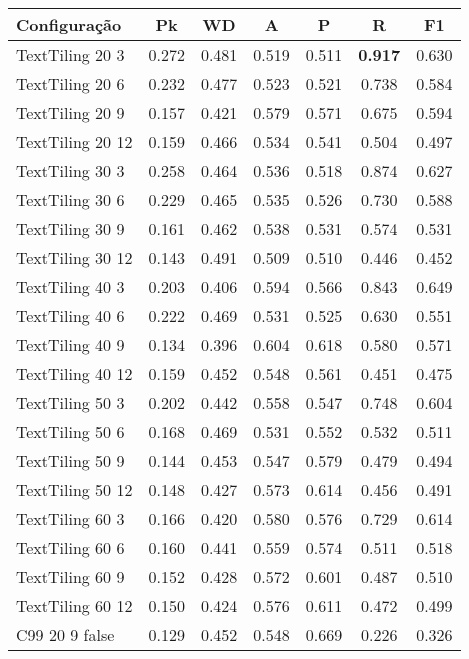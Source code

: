 \documentclass{article}
\begin{document}
 
\begin{tabular}{|l|c|c|c|c|c|c|} 
\hline 
Configuração & \textbf{Pk} & \textbf{WD} & \textbf{A } & \textbf{P } & \textbf{R } & \textbf{F1}\\ \hline
TextTiling 20  3 & 0.272 & 0.481 & 0.519 & 0.511 & \textbf{0.917} & 0.630\\ \hline
TextTiling 20  6 & 0.232 & 0.477 & 0.523 & 0.521 & 0.738 & 0.584\\ \hline
TextTiling 20  9 & 0.157 & 0.421 & 0.579 & 0.571 & 0.675 & 0.594\\ \hline
TextTiling 20 12 & 0.159 & 0.466 & 0.534 & 0.541 & 0.504 & 0.497\\ \hline
TextTiling 30  3 & 0.258 & 0.464 & 0.536 & 0.518 & 0.874 & 0.627\\ \hline
TextTiling 30  6 & 0.229 & 0.465 & 0.535 & 0.526 & 0.730 & 0.588\\ \hline
TextTiling 30  9 & 0.161 & 0.462 & 0.538 & 0.531 & 0.574 & 0.531\\ \hline
TextTiling 30 12 & 0.143 & 0.491 & 0.509 & 0.510 & 0.446 & 0.452\\ \hline
TextTiling 40  3 & 0.203 & 0.406 & 0.594 & 0.566 & 0.843 & 0.649\\ \hline
TextTiling 40  6 & 0.222 & 0.469 & 0.531 & 0.525 & 0.630 & 0.551\\ \hline
TextTiling 40  9 & 0.134 & 0.396 & 0.604 & 0.618 & 0.580 & 0.571\\ \hline
TextTiling 40 12 & 0.159 & 0.452 & 0.548 & 0.561 & 0.451 & 0.475\\ \hline
TextTiling 50  3 & 0.202 & 0.442 & 0.558 & 0.547 & 0.748 & 0.604\\ \hline
TextTiling 50  6 & 0.168 & 0.469 & 0.531 & 0.552 & 0.532 & 0.511\\ \hline
TextTiling 50  9 & 0.144 & 0.453 & 0.547 & 0.579 & 0.479 & 0.494\\ \hline
TextTiling 50 12 & 0.148 & 0.427 & 0.573 & 0.614 & 0.456 & 0.491\\ \hline
TextTiling 60  3 & 0.166 & 0.420 & 0.580 & 0.576 & 0.729 & 0.614\\ \hline
TextTiling 60  6 & 0.160 & 0.441 & 0.559 & 0.574 & 0.511 & 0.518\\ \hline
TextTiling 60  9 & 0.152 & 0.428 & 0.572 & 0.601 & 0.487 & 0.510\\ \hline
TextTiling 60 12 & 0.150 & 0.424 & 0.576 & 0.611 & 0.472 & 0.499\\ \hline
C99 20  9 false & 0.129 & 0.452 & 0.548 & 0.669 & 0.226 & 0.326\\ \hline

\end{tabular}
\end{document}
